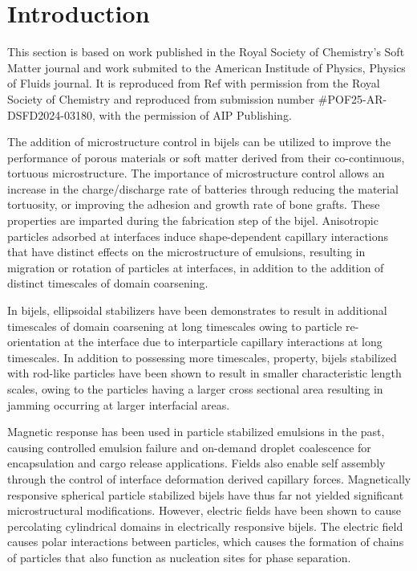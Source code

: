 \section{Introduction}

This section is based on work published in the Royal Society of Chemistry's Soft Matter journal and
work submited to the American Institude of Physics, Physics of Fluids journal. \cite{karthikeyan_formation_2024} 
It is reproduced from Ref \cite{karthikeyan_formation_2024} with permission from the Royal Society of Chemistry and 
reproduced from submission number \#POF25-AR-DSFD2024-03180, with the permission of AIP Publishing.

The addition of microstructure control in bijels can be utilized to improve the performance of porous materials
or soft matter derived from their co-continuous, tortuous microstructure. The importance of microstructure control
allows an increase in the charge/discharge rate of batteries through reducing the material tortuosity, or improving the 
adhesion and growth rate of bone grafts. These properties are imparted during the fabrication step of the bijel. Anisotropic
particles adsorbed at interfaces induce shape-dependent capillary interactions that have distinct effects on the
microstructure of emulsions, resulting in migration or rotation of particles at interfaces, in addition to the addition of
distinct timescales of domain coarsening. \cite{loudet_capillary_2005, cavallaro_curvature-driven_2011, gunther_lattice_2013}

In bijels, ellipsoidal stabilizers have been demonstrates to result in additional timescales of domain coarsening 
at long timescales owing to particle re-orientation at the interface due to interparticle capillary interactions 
at long timescales. \cite{gunther_timescales_2014} In addition to possessing more timescales, property, bijels stabilized 
with rod-like particles have been shown to result in smaller characteristic length scales, owing to the particles having a
larger cross sectional area resulting in jamming occurring at larger interfacial areas. \cite{hijnen_bijels_2015} 

Magnetic response has been used in particle stabilized emulsions in the past, causing controlled emulsion failure and
on-demand droplet coalescence for encapsulation and cargo release applications. \cite{melle_pickering_2005, zhou_magnetic_2011}
Fields also enable self assembly through the control of interface deformation derived capillary forces.
\cite{morgan_understanding_2013,davies_interface_2014,davies_dipolar_2015} Magnetically responsive spherical particle 
stabilized bijels have thus far not yielded significant microstructural modifications. \cite{kim_bijels_2010} However, 
electric fields have been shown to cause percolating cylindrical domains in electrically responsive bijels. \cite{carmack_tuning_2018}
The electric field causes polar interactions between particles, which causes the formation of chains of particles that
also function as nucleation sites for phase separation. \cite{carmack_tuning_2018}

